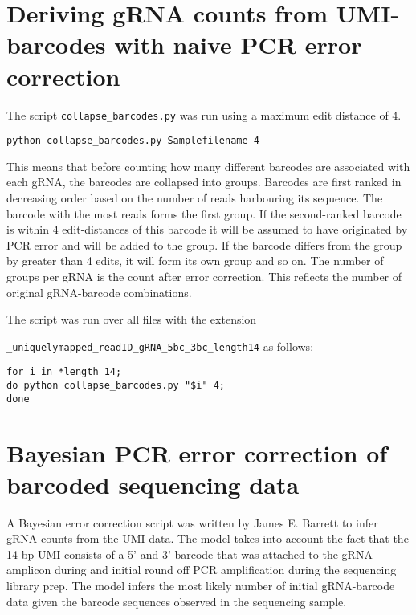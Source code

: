 \section{Deriving gRNA counts from UMI-barcodes with naive PCR error correction}

The script \verb|collapse_barcodes.py| was run using a maximum edit distance of 4. 

\begin{small}\begin{lstlisting}
python collapse_barcodes.py Samplefilename 4
\end{lstlisting}\end{small}

This means that before counting how many different barcodes are associated with each gRNA, the barcodes are collapsed into groups. Barcodes are first ranked in decreasing order based on the number of reads harbouring its sequence. The barcode with the most reads forms the first group. If the second-ranked barcode is within 4 edit-distances of this barcode it will be assumed to have originated by PCR error and will be added to the group. If the barcode differs from the group by greater than 4 edits, it will form its own group and so on. The number of groups per gRNA is the count after error correction. This reflects the number of original gRNA-barcode combinations.


The script was run over all files with the extension 

\verb|_uniquelymapped_readID_gRNA_5bc_3bc_length14| as follows:

\begin{small}\begin{lstlisting}
for i in *length_14;
do python collapse_barcodes.py "$i" 4;
done
\end{lstlisting}\end{small}


\section{Bayesian PCR error correction of barcoded sequencing data }

A Bayesian error correction script was written by James E. Barrett to infer gRNA counts from the UMI data. The model takes into account the fact that the 14 bp UMI consists of a 5' and 3' barcode that was attached to the gRNA amplicon during and initial round off PCR amplification during the sequencing library prep. The model infers the most likely number of initial gRNA-barcode data given the barcode sequences observed in the sequencing sample.

